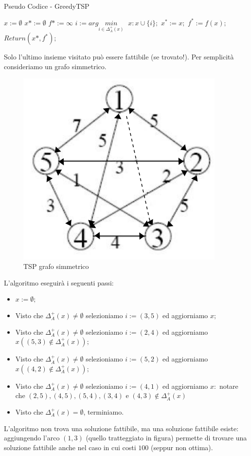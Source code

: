 \documentclass{article}
\begin{document}
\begin{algorithm}[H]
    \caption{Pseudo Codice - GreedyTSP}
    \begin{algorithmic}
        \State $x:=\emptyset$
        \State $x*:=\emptyset$
        \State $f*:=\infty$
        \State $i:=arg\underset{i \in \Delta_A^+(x)}{min}\;$
        \State $x:x\cup\{i\};$
        \EndWhile
        \State $x^*:=x;$
        \State $f^*:=f(x);$
        \EndIf
        \State $Return(x*,f^*);$
    \end{algorithmic}
\end{algorithm}
Solo l'ultimo insieme visitato può essere fattibile (se trovato!).
Per semplicità consideriamo un grafo simmetrico.
\begin{figure}[H]
    \centering
    \includegraphics[scale=0.5]{images/TSP_simm.png}
    \caption{TSP grafo simmetrico}
\end{figure}
L'algoritmo eseguirà i seguenti passi:
\begin{itemize}
    \item $x:=\emptyset;$
    \item Visto che $\Delta_A^+(x)\neq\emptyset$ selezioniamo $i:=(3,5)$ ed aggiorniamo $x;$
    \item Visto che $\Delta_A^+(x)\neq\emptyset$ selezioniamo $i:=(2,4)$ ed aggiorniamo $x((5,3)\notin\Delta_A^+(x));$
    \item Visto che $\Delta_A^+(x)\neq\emptyset$ selezioniamo $i:=(5,2)$ ed aggiorniamo $x((4,2)\notin\Delta_A^+(x));$
    \item Visto che $\Delta_A^+(x)\neq\emptyset$ selezioniamo $i:=(4,1)$ ed aggiorniamo $x:$
          notare che $(2,5),(4,5),(5,4),(3,4)$ e $(4,3)\notin \Delta_A^+(x)$
    \item Visto che $\Delta_A^+(x)=\emptyset$, terminiamo.
\end{itemize}
L'algoritmo non trova una soluzione fattibile, ma una soluzione fattibile esiste: aggiungendo
l'arco $(1,3)$ (quello tratteggiato in figura) permette di trovare una soluzione fattibile anche
nel caso in cui costi $100$ (seppur non ottima).
\end{document}
